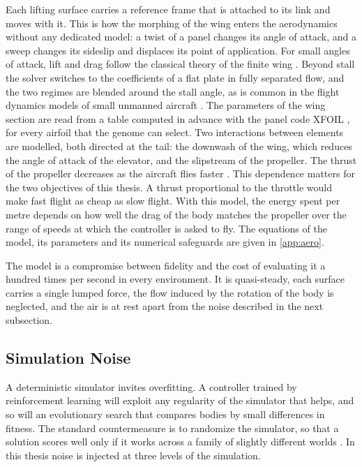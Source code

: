Each lifting surface carries a reference frame that is attached to its link and moves with it. This is how the morphing of the wing enters the aerodynamics without any dedicated model: a twist of a panel changes its angle of attack, and a sweep changes its sideslip and displaces its point of application. For small angles of attack, lift and drag follow the classical theory of the finite wing \cite{anderson2017fundamentals}. Beyond stall the solver switches to the coefficients of a flat plate in fully separated flow, and the two regimes are blended around the stall angle, as is common in the flight dynamics models of small unmanned aircraft \cite{beard2012small}. The parameters of the wing section are read from a table computed in advance with the panel code XFOIL \cite{drela1989xfoil}, for every airfoil that the genome can select. Two interactions between elements are modelled, both directed at the tail: the downwash of the wing, which reduces the angle of attack of the elevator, and the slipstream of the propeller. The thrust of the propeller decreases as the aircraft flies faster \cite{mccormick1995aerodynamics}. This dependence matters for the two objectives of this thesis. A thrust proportional to the throttle would make fast flight as cheap as slow flight. With this model, the energy spent per metre depends on how well the drag of the body matches the propeller over the range of speeds at which the controller is asked to fly. The equations of the model, its parameters and its numerical safeguards are given in \autoref{app:aero}.

The model is a compromise between fidelity and the cost of evaluating it a hundred times per second in every environment. It is quasi-steady, each surface carries a single lumped force, the flow induced by the rotation of the body is neglected, and the air is at rest apart from the noise described in the next subsection.

\subsection{Simulation Noise}
\label{subsec:genesis-noise}

A deterministic simulator invites overfitting. A controller trained by reinforcement learning will exploit any regularity of the simulator that helps, and so will an evolutionary search that compares bodies by small differences in fitness. The standard countermeasure is to randomize the simulator, so that a solution scores well only if it works across a family of slightly different worlds \cite{tobin2017domain, peng2018sim}. In this thesis noise is injected at three levels of the simulation.

